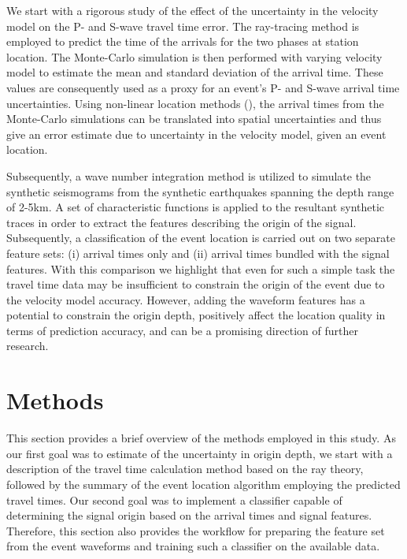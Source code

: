 We start with a rigorous study of the effect of the uncertainty in the velocity model on the P- and S-wave travel time error. The ray-tracing method is employed to predict the time of the arrivals for the two phases at station location. The Monte-Carlo simulation is then performed with varying velocity model to estimate the mean and standard deviation of the arrival time. These values are consequently used as a proxy for an event's P- and S-wave arrival time uncertainties. Using non-linear location methods (\cite{lomax_precise_2001}), the arrival times from the Monte-Carlo simulations can be translated into spatial uncertainties and thus give an error estimate due to uncertainty in the velocity model, given an event location.


Subsequently, a wave number integration method is utilized to simulate the synthetic seismograms from the synthetic earthquakes spanning the depth range of 2-5km. A set of characteristic functions is applied to the resultant synthetic traces in order to extract the features describing the origin of the signal. Subsequently, a classification of the event location is carried out on two separate feature sets: (i) arrival times only and (ii) arrival times bundled with the signal features. With this comparison we highlight that even for such a simple task the travel time data may be insufficient to constrain the origin of the event due to the velocity model accuracy. However, adding the waveform features has a potential to constrain the origin depth, positively affect the location quality in terms of prediction accuracy, and can be a promising direction of further research.

\section{Methods}
%
This section provides a brief overview of the methods employed in this study. As our first goal was to estimate of the uncertainty in origin depth, we start with a description of the travel time calculation method based on the ray theory, followed by the summary of the event location algorithm employing the predicted travel times. Our second goal was to implement a classifier capable of determining the signal origin based on the arrival times and signal features. Therefore, this section also provides the workflow for preparing the feature set from the event waveforms and training such a classifier on the available data.

